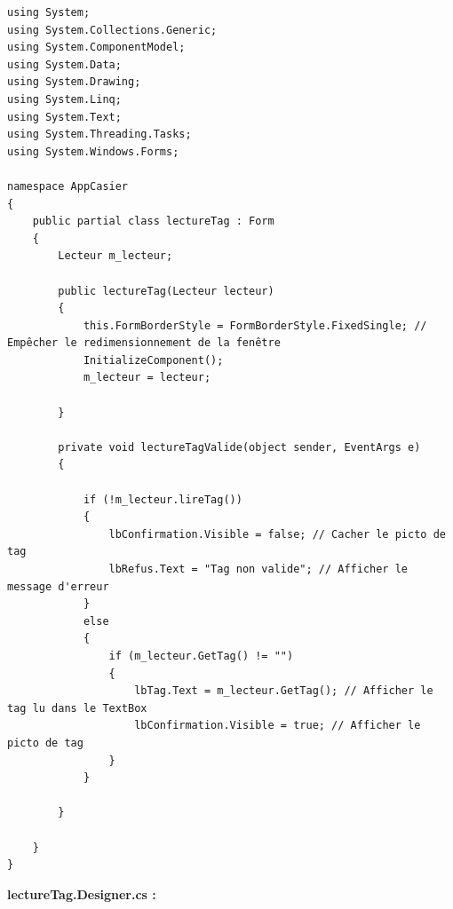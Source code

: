 \documentclass[main.tex]{subfiles}
\begin{document}
\begin{lstlisting}
using System;
using System.Collections.Generic;
using System.ComponentModel;
using System.Data;
using System.Drawing;
using System.Linq;
using System.Text;
using System.Threading.Tasks;
using System.Windows.Forms;

namespace AppCasier
{
    public partial class lectureTag : Form
    {
        Lecteur m_lecteur;

        public lectureTag(Lecteur lecteur)
        {
            this.FormBorderStyle = FormBorderStyle.FixedSingle; // Empêcher le redimensionnement de la fenêtre
            InitializeComponent();
            m_lecteur = lecteur;

        }

        private void lectureTagValide(object sender, EventArgs e)
        {
            
            if (!m_lecteur.lireTag())
            {
                lbConfirmation.Visible = false; // Cacher le picto de tag
                lbRefus.Text = "Tag non valide"; // Afficher le message d'erreur
            }
            else
            {
                if (m_lecteur.GetTag() != "")
                {
                    lbTag.Text = m_lecteur.GetTag(); // Afficher le tag lu dans le TextBox
                    lbConfirmation.Visible = true; // Afficher le picto de tag
                }
            }

        }

    }
}
\end{lstlisting}

\textbf{lectureTag.Designer.cs :}
\end{document}
